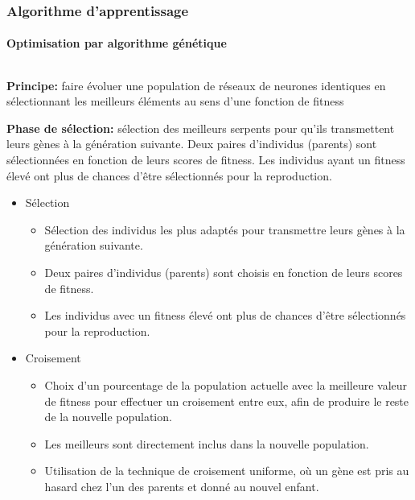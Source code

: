 \documentclass[10pt]{beamer}
\begin{document}
\begin{frame}
\frametitle{Algorithme d'apprentissage}
\framesubtitle{Optimisation par algorithme génétique}   
\begin{columns}[T]
\begin{column}{0.60\textwidth}
\footnotesize
\textbf{Principe:} faire évoluer une population de réseaux de neurones identiques en sélectionnant les meilleurs éléments au sens d'une fonction de fitness

\textbf{Phase de sélection:} sélection des meilleurs serpents pour qu'ils transmettent leurs gènes à la génération suivante. Deux paires d'individus (parents) sont sélectionnées en fonction de leurs scores de fitness. Les individus ayant un fitness élevé ont plus de chances d'être sélectionnés pour la reproduction.

\begin{itemize}
  \item Sélection
    \begin{itemize}
      \item Sélection des individus les plus adaptés pour transmettre leurs gènes à la génération suivante.
      \item Deux paires d'individus (parents) sont choisis en fonction de leurs scores de fitness.
      \item Les individus avec un fitness élevé ont plus de chances d'être sélectionnés pour la reproduction.
    \end{itemize}
  
  \item Croisement
    \begin{itemize}
      \item Choix d'un pourcentage de la population actuelle avec la meilleure valeur de fitness pour effectuer un croisement entre eux, afin de produire le reste de la nouvelle population.
      \item Les meilleurs sont directement inclus dans la nouvelle population.
      \item Utilisation de la technique de croisement uniforme, où un gène est pris au hasard chez l'un des parents et donné au nouvel enfant.
    \end{itemize}
  

\end{itemize}
\end{column}
\end{columns}
\end{frame}
\end{document}
